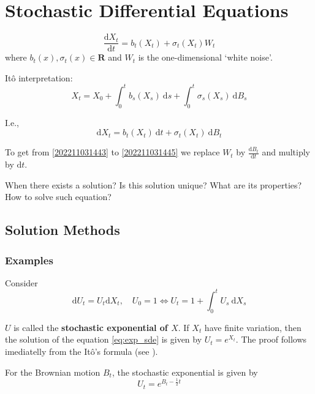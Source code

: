 \chapter{Stochastic Differential Equations}

\begin{equation}\label{202211031443}
    \frac{\mathrm{d} X_t}{\mathrm{d} t} = b_t(X_t) + \sigma_t(X_t) W_t
\end{equation}
where $b_t(x), \sigma_t(x) \in \textbf{R}$ and $W_t$ is the one-dimensional `white noise'.

Itô interpretation:
\begin{equation}\label{202211031444}
    X_t = X_0 + \int_0^t b_s(X_s)~\mathrm{d}s + \int_0^t \sigma_s(X_s)~\mathrm{d}B_s
\end{equation}

I.e.,
\begin{equation}\label{202211031445}
    \mathrm{d} X_t = b_t(X_t)~\mathrm{d}t + \sigma_t(X_t)~\mathrm{d}B_t
\end{equation}

To get from \eqref{202211031443} to \eqref{202211031445} we replace $W_t$ by $\frac{\mathrm{d}B_t}{\mathrm{d}t}$ and multiply by $\mathrm{d}t$.

When there exists a solution? Is this solution unique? What are its properties? How to solve such equation?

\section{Solution Methods}

\subsection{Examples}

\begin{example}
    Consider
    \begin{equation}\label{eq:exp_sde}
        \mathrm{d}U_t = U_t \mathrm{d}X_t, \quad U_0 = 1 \iff U_t = 1 + \int_0^t U_s ~\mathrm{d}X_s
    \end{equation}

    $U$ is called the \textbf{stochastic exponential of $X$}. If $X_t$ have finite variation, then the solution of the equation \eqref{eq:exp_sde} is given by $U_t = e^{X_t}$. The proof follows imediatelly from the Itô's formula (see \cite{klebaner2012introduction}).

    For the Brownian motion $B_t$, the stochastic exponential is given by
    \begin{equation}
        U_t = e^{B_t - \frac{1}{2}t}
    \end{equation}
\end{example}

